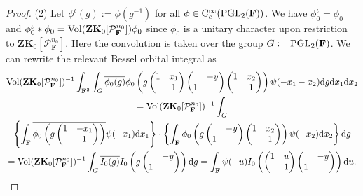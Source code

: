 \documentclass[A4]{amsart}
\numberwithin{equation}{section} \everymath{\displaystyle}
\newcommand{\Cont}{{\rm C}}
\newcommand{\gp}[1]{\mathbf{#1}}
\newcommand{\PGL}{{\rm PGL}}
\newcommand{\ud}{\mathrm{d}}
\newcommand{\F}{\mathbf{F}}
\newcommand{\vP}{\mathcal{P}}
\newcommand{\Vol}{{\rm Vol}}
\begin{document}
\begin{proof}
\noindent (2) Let $\phi^{\iota}(g) := \overline{\phi(g^{-1})}$ for all $\phi \in \Cont_c^{\infty}(\PGL_2(\F))$. We have $\phi_0^{\iota} = \phi_0$ and $\phi_0^{\iota} * \phi_0 = \Vol(\gp{Z} \gp{K}_0[\vP_{\F}^{n_0}]) \phi_0$ since $\phi_0$ is a unitary character upon restriction to $\gp{Z}\gp{K}_0[\vP_{\F}^{n_0}]$. Here the convolution is taken over the group $G := \PGL_2(\F)$. We can rewrite the relevant Bessel orbital integral as
\begin{multline*}
	\Vol(\gp{Z} \gp{K}_0[\vP_{\F}^{n_0}])^{-1} \int_{\F^2} \int_G \overline{\phi_0(g)} \phi_0 \left( g \begin{pmatrix} 1 & x_1 \\ & 1 \end{pmatrix} \begin{pmatrix} & -y \\ 1 & \end{pmatrix} \begin{pmatrix} 1 & x_2 \\ & 1 \end{pmatrix} \right) \psi(-x_1-x_2) \ud g \ud x_1 \ud x_2 \\
	= \Vol(\gp{Z} \gp{K}_0[\vP_{\F}^{n_0}])^{-1} \int_G \\
	\left\{ \int_{\F} \overline{\phi_0\left( g \begin{pmatrix} 1 & -x_1 \\ & 1 \end{pmatrix} \right)} \psi(-x_1) \ud x_1 \right\} \cdot \left\{ \int_{\F} \phi_0 \left( g \begin{pmatrix} & -y \\ 1 & \end{pmatrix} \begin{pmatrix} 1 & x_2 \\ & 1 \end{pmatrix} \right) \psi(-x_2) \ud x_2 \right\} \ud g \\
	= \Vol(\gp{Z} \gp{K}_0[\vP_{\F}^{n_0}])^{-1} \int_G \overline{I_0(g)} I_0 \left( g \begin{pmatrix} & -y \\ 1 & \end{pmatrix} \right) \ud g = \int_{\F} \psi(-u) I_0 \left( \begin{pmatrix} 1 & u \\ & 1 \end{pmatrix} \begin{pmatrix} & -y \\ 1 & \end{pmatrix} \right) \ud u.
\end{multline*}

\end{proof}
\end{document}
